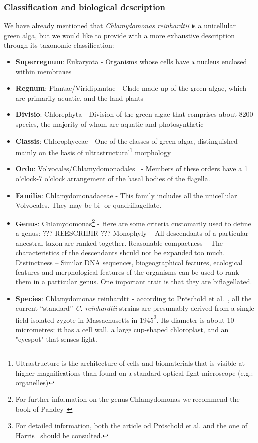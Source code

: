 \subsubsection{Classification and biological description}
\label{bio_chlamy}

We have already mentioned that \textit{Chlamydomonas reinhardtii}
is a unicellular green alga, but we would like to provide with a more exhaustive description through its taxonomic classification: 

\begin{itemize}
	\item \textbf{Superregnum}: Eukaryota - Organisms whose cells have a nucleus enclosed within membranes	
	\item \textbf{Regnum}: Plantae/Viridiplantae - Clade made up of the green algae, which are primarily aquatic, and the land plants
	\item \textbf{Divisio}: Chlorophyta - Division of the green algae that comprises about 8200 species, the majority of whom are aquatic and photosynthetic
	\item \textbf{Classis}: Chlorophyceae - One of the classes of green algae, distinguished mainly on the basis of ultrastructural\footnote{Ultrastructure is the architecture of cells and biomaterials that is visible at higher magnifications than found on a standard optical light microscope (e.g.: organelles)} morphology
	\item \textbf{Ordo}: Volvocales/Chlamydomonadales~\cite{chlorophyceae} - Members of these orders have a 1 o'clock-7 o'clock arrangement of the basal bodies of the flagella.
	\item \textbf{Familia}: Chlamydomonadaceae - This family includes all the unicellular Volvocales. They may be bi- or quadriflagellate.
	\item \textbf{Genus}: Chlamydomonas\footnote{For further information on the genus Chlamydomonas we recommend the book of Pandey~\cite{Pandey}} - Here are some criteria customarily used to define a genus:
	??? REESCRIBIR ???
		\subitem Monophyly – All descendants of a particular ancestral taxon are ranked together.
		\subitem Reasonable compactness – The characteristics of the descendants should not be expanded too much.
		\subitem Distinctness – Similar DNA sequences, biogeographical features, ecological features and morphological features of the organisms can be used to rank them in a particular genus. One important trait is that they are biflagellated.
	\item \textbf{Species}: Chlamydomonas reinhardtii - according to Pröschold et al.~\cite{Proschold}, all the current “standard” \textit{C. reinhardtii} strains are presumably derived from a single field-isolated zygote in Massachusetts in 1945\footnote{For detailed information, both the article od Pröschold et al. and the one of Harris~\cite{Harris} should be consulted.}. Its diameter is about 10 micrometres; it has a cell wall, a large cup-shaped chloroplast, and an "eyespot" that senses light. 
\end{itemize}

